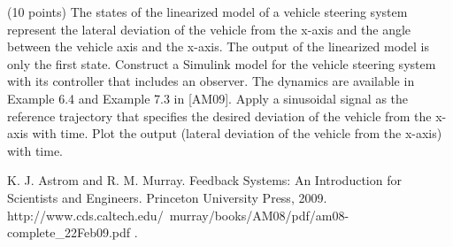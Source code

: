 \documentclass[a4paper,12pt]{article}
\begin{document}
\begin{problem}{}
(10 points) The states of the linearized model of a vehicle steering system represent the lateral deviation of the vehicle from the x-axis and the angle between the vehicle axis and the x-axis. The output of the linearized model is only the first state. Construct a Simulink model for the vehicle steering system with its controller that includes an observer. The dynamics are available in Example 6.4 and Example 7.3 in [AM09]. Apply a sinusoidal signal as the reference trajectory that specifies the desired deviation of the vehicle from the x-axis with time. Plot the output (lateral deviation of the vehicle from the x-axis) with time.

\noindent
\noindent
[AM09] K. J. Astrom and R. M. Murray. Feedback Systems: An Introduction for Scientists and Engineers. Princeton University Press, 2009. \\
http://www.cds.caltech.edu/~murray/books/AM08/pdf/am08-complete\_22Feb09.pdf . \\
\\
\begin{minipage}{1\textwidth}
  \rectangle{\linewidth}{20cm}
\end{minipage}
\newpage
\ \\
\begin{minipage}{1\textwidth}
  \rectangle{\linewidth}{24cm}
\end{minipage}
\newpage
\ \\
\begin{minipage}{1\textwidth}
  \rectangle{\linewidth}{24cm}
\end{minipage}
\newpage
\ \\
\begin{minipage}{1\textwidth}
  \rectangle{\linewidth}{24cm}
\end{minipage}
\end{problem}
\end{document}
